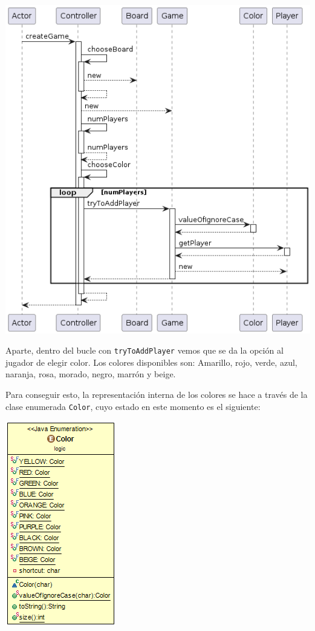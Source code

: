 \documentclass[../DocumentoOficial.tex]{subfiles}
\begin{document}
\begin{sprint}[2]
\begin{center}
\includegraphics[scale=0.45]{Controller.createGame()-sprint2.png} 
\end{center}

Aparte, dentro del bucle con \texttt{tryToAddPlayer} vemos que se da la opción al jugador de elegir color. Los colores disponibles son: Amarillo, rojo, verde, azul, naranja, rosa, morado, negro, marrón y beige.

Para conseguir esto, la representación interna de los colores se hace a través de la clase enumerada \texttt{Color}, cuyo estado en este momento es el siguiente:

\begin{center}
\includegraphics[scale=0.75]{Color-sprint2.png} 
\end{center}

\end{sprint}
\end{document}

